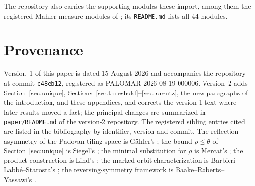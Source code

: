 \documentclass[11pt]{amsart}
\theoremstyle{plain}
\theoremstyle{definition}
\theoremstyle{remark}
\begin{document}
The repository also carries the supporting modules these import, among them the
registered Mahler-measure modules of \cite{palomar-mahler}; its \texttt{README.md} lists all
$44$ modules.
\endgroup

\section{Provenance}
\label{app:provenance}

Version~1 of this paper is dated 15 August 2026 and accompanies the repository at commit
\texttt{c48eb12}, registered as PALOMAR-2026-08-19-000006. Version~2 adds
Section~\ref{sec:unique}, Sections~\ref{sec:threshold}--\ref{sec:lorentz}, the new paragraphs of
the introduction, and these appendices, and corrects the version-1 text where later results
moved a fact; the principal changes are summarized in \texttt{paper/README.md} of the
version-2 repository. The registered sibling entries cited are
listed in the bibliography by identifier, version and commit. The reflection asymmetry of the
Padovan tiling space is G\"ahler's \cite{gahler2026}; the bound $\rho \le \theta$ of
Section~\ref{sec:unique} is Siegel's \cite{siegel1944}; the minimal substitution for $\rho$ is
Mercat's \cite{mercat2020}; the product construction is Lind's \cite{lind1983,lind1984}; the
marked-orbit characterization is Barbieri--Labb\'e--Starosta's \cite{barbieri2021}; the
reversing-symmetry framework is Baake--Roberts--Yassawi's \cite{baakeroberts2018}.
\end{document}
